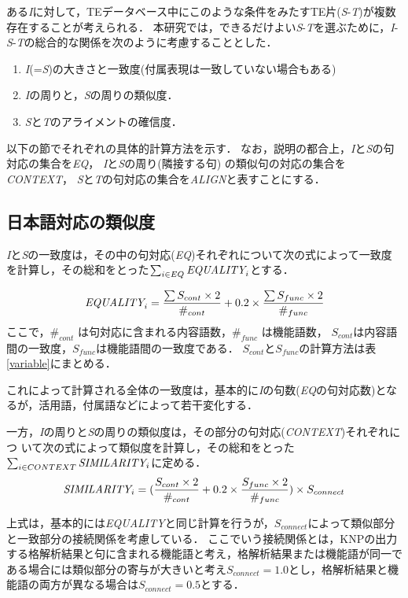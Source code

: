\documentclass{nlp}
\begin{document}
ある{\it I}に対して，TEデータベース中にこのような条件をみたすTE片({\it S}-{\it T})が複数存在することが考えられる．
本研究では，できるだけよい{\it S}-{\it T}を選ぶために，{\it I}-{\it S}-{\it T}の総合的な関係を次のように考慮することとした．

\begin{enumerate}
\item {\it I}(={\it S})の大きさと一致度(付属表現は一致していない場合もある)
\item {\it I}の周りと，{\it S}の周りの類似度．
\item {\it S}と{\it T}のアライメントの確信度．
\end{enumerate}

以下の節でそれぞれの具体的計算方法を示す．
なお，説明の都合上，{\it I}と{\it S}の句対応の集合を{\it EQ}，
{\it I}と{\it S}の周り(隣接する句) の類似句の対応の集合を{\it CONTEXT}，
{\it S}と{\it T}の句対応の集合を{\it ALIGN}と表すことにする．

\subsection{日本語対応の類似度}

{\it I}と{\it S}の一致度は，その中の句対応({\it EQ})それぞれについて次の式によって一致度を計算し，その総和をとった$\sum_{i \in EQ}\mbox{{\it EQUALITY}}_i$とする．

\begin{equation}
\mbox{{\it EQUALITY}}_i = \frac{\sum S_{cont} \times 2 }{\#_{cont}} + 0.2 \times \frac{\sum S_{func} \times 2}{\#_{func}}
\end{equation}
ここで，$\#_{cont}$ は句対応に含まれる内容語数，$\#_{func}$ は機能語数，
$S_{cont}$は内容語間の一致度，$S_{func}$は機能語間の一致度である．
$S_{cont}$と$S_{func}$の計算方法は表\ref{variable}にまとめる．

これによって計算される全体の一致度は，基本的に{\it I}の句数({\it EQ}の句対応数)とな
るが，活用語，付属語などによって若干変化する．

一方，{\it I}の周りと{\it S}の周りの類似度は，その部分の句対応({\it CONTEXT})それぞれにつ
いて次の式によって類似度を計算し，その総和をとった$\sum_{i \in CONTEXT}\mbox{{\it SIMILARITY}}_i$に定める．
\begin{equation}
\mbox{{\it SIMILARITY}}_i = (\frac{S_{cont} \times 2 }{\#_{cont}} + 0.2 \times \frac{S_{func} \times 2}{\#_{func}}) \times S_{connect}
\end{equation}

上式は，基本的には{\it EQUALITY}と同じ計算を行うが，$S_{connect}$によって類似部分と一致部分の接続関係を考慮している．
ここでいう接続関係とは，KNPの出力する格解析結果と句に含まれる機能語と考え，格解析結果または機能語が同一である場合には類似部分の寄与が大きいと考え$S_{connect}=1.0$とし，格解析結果と機能語の両方が異なる場合は$S_{connect}=0.5$とする．
\end{document}

